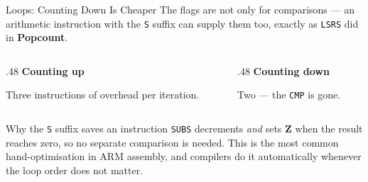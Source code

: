 \documentclass[9pt,aspectratio=169,xcolor=table]{beamer}
\begin{document}
\begin{frame}[fragile]{Loops: Counting Down Is Cheaper}
    \leavevmode
    {\small The flags are not only for comparisons --- an arithmetic
    instruction with the \texttt{S} suffix can supply them too, exactly
    as \texttt{LSRS} did in \textbf{Popcount}.}

    \vspace{1mm}
    \begin{columns}[T]
    \begin{column}{.48\textwidth}
        \textbf{Counting up}

        \vspace{1mm}

        \vspace{3mm}
        {\small \alert{Three} instructions of overhead per iteration.}
    \end{column}
    \begin{column}{.48\textwidth}
        \textbf{Counting down}

        \vspace{1mm}

        \vspace{3mm}
        {\small \alert{Two} --- the \texttt{CMP} is gone.}
    \end{column}
    \end{columns}

    \vspace{2mm}
    \begin{block}{Why the \texttt{S} suffix saves an instruction}
        \texttt{SUBS} decrements \emph{and} sets \textbf{Z} when the
        result reaches zero, so no separate comparison is needed. This
        is the most common hand-optimisation in ARM assembly, and
        compilers do it automatically whenever the loop order does not
        matter.
    \end{block}
\end{frame}
\end{document}
